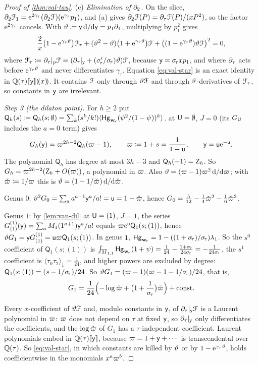 \begin{proof}[Proof of \cref{thm:val-tau}]
(c) \emph{Elimination of $\partial_2$.} On the slice, $\partial_2\mathcal{F}_1=\mathrm{e}^{2\gamma_\tau}(\partial_2\mathcal{F})(\mathrm{e}^{\gamma_\tau}p_1)$, and (a) gives $\partial_2\mathcal{F}(P)=\partial_\tau\mathcal{F}(P)/(xP^2)$, so the factor $\mathrm{e}^{2\gamma_\tau}$ cancels. With $\vartheta\coloneqq\mathsf{y}\,\mathrm{d}/\mathrm{d}\mathsf{y}=p_1\partial_1$, multiplying by $p_1^2$ gives
\begin{equation}\label{eq:val-star}
\frac{2}{x}\bigl(1-\mathrm{e}^{\gamma_\tau\vartheta}\bigr)\mathcal{F}_\tau+(\vartheta^2-\vartheta)\bigl(1+\mathrm{e}^{\gamma_\tau\vartheta}\bigr)\mathcal{F}+\bigl((1-\mathrm{e}^{\gamma_\tau\vartheta})\vartheta\mathcal{F}\bigr)^2=0,
\end{equation}
where $\mathcal{F}_\tau\coloneqq\partial_\tau|_p\mathcal{F}=(\partial_\tau|_{\mathsf{y}}+(\sigma_{\!\tau}'/\sigma_{\!\tau})\vartheta)\mathcal{F}$, because $\mathsf{y}=\sigma_{\!\tau} xp_1$, and where $\partial_\tau$ acts before $\mathrm{e}^{\gamma_\tau\vartheta}$ and never differentiates $\gamma_\tau$. Equation \eqref{eq:val-star} is an exact identity in $\mathbb{Q}(\tau)[\![ \mathsf{y} ]\!](\!(x)\!)$. It contains $\mathcal{F}$ only through $\vartheta\mathcal{F}$ and through $\vartheta$-derivatives of $\mathcal{F}_\tau$, so constants in $\mathsf{y}$ are irrelevant.

\emph{Step 3 (the dilaton point).} For $h\geq 2$ put $\mathsf{Q}_h(s)\coloneqq\mathsf{Q}_h(s;\emptyset)=\sum_k(s^k/k!)\langle\mathsf{Hg}_{\mathbf{w}_{\!\tau}}(\psi^2/(1-\psi))^k\rangle$.  at $\mathsf{U}=\emptyset$, $J=0$ (its $G_{\mathsf{U}}$ includes the $a=0$ term) gives
\[
G_h(\mathsf{y})=\varpi^{2h-2}\mathsf{Q}_h(\varpi-1),\qquad\varpi\coloneqq1+s=\frac{1}{1-\mathsf{u}},\qquad\mathsf{y}=\mathsf{u}\mathrm{e}^{-\mathsf{u}}.
\]
The polynomial $\mathsf{Q}_h$ has degree at most $3h-3$ and $\mathsf{Q}_h(-1)=\mathrm{Z}_h$. So $G_h=\varpi^{2h-2}(\mathrm{Z}_h+O(\varpi))$, a polynomial in $\varpi$. Also $\vartheta=(\varpi-1)\varpi^2\,\mathrm{d}/\mathrm{d}\varpi$; with $\check{\varpi}\coloneqq1/\varpi$ this is $\vartheta=(1-1/\check{\varpi})\,\mathrm{d}/\mathrm{d}\check{\varpi}$.

Genus $0$: $\vartheta^2G_0=\sum_aa^{a-1}\mathsf{y}^a/a!=\mathsf{u}=1-\check{\varpi}$, hence $G_0=\tfrac{5}{12}-\tfrac14\check{\varpi}^2-\tfrac16\check{\varpi}^3$.

Genus $1$: by \cref{lem:van-dil} at $\mathsf{U}=(1)$, $J=1$, the series $G^{(1)}_{(1)}(\mathsf{y})=\sum_aM_1(1^{a+1})\mathsf{y}^a/a!$ equals $\varpi\mathrm{e}^{\mathsf{u}}\mathsf{Q}_1(s;(1))$, hence $\vartheta G_1=\mathsf{y} G^{(1)}_{(1)}=\mathsf{u}\varpi\mathsf{Q}_1(s;(1))$. In genus $1$, $\mathsf{Hg}_{\mathbf{w}_{\!\tau}}=1-((1+\sigma_{\!\tau})/\sigma_{\!\tau})\lambda_1$. So the $s^0$ coefficient of $\mathsf{Q}_1(s;(1))$ is $\int_{\overline{M}_{1,1}}\mathsf{Hg}_{\mathbf{w}_{\!\tau}}(1+\psi)=\tfrac{1}{24}-\tfrac{1+\sigma_{\!\tau}}{24\sigma_{\!\tau}}=-\tfrac{1}{24\sigma_{\!\tau}}$, the $s^1$ coefficient is $\langle\tau_0\tau_2\rangle_1=\tfrac{1}{24}$, and higher powers are excluded by degree: $\mathsf{Q}_1(s;(1))=(s-1/\sigma_{\!\tau})/24$. So $\vartheta G_1=(\varpi-1)(\varpi-1-1/\sigma_{\!\tau})/24$, that is,
\[
G_1=\frac{1}{24}\Bigl(-\log\check{\varpi}+\bigl(1+\frac{1}{\sigma_{\!\tau}}\bigr)\check{\varpi}\Bigr)+\text{const}.
\]

Every $x$-coefficient of $\vartheta\mathcal{F}$ and, modulo constants in $\mathsf{y}$, of $\partial_\tau|_{\mathsf{y}}\mathcal{F}$ is a Laurent polynomial in $\varpi$: $\varpi$ does not depend on $\tau$ at fixed $\mathsf{y}$, so $\partial_\tau|_{\mathsf{y}}$ only differentiates the coefficients, and the $\log\check{\varpi}$ of $G_1$ has a $\tau$-independent coefficient. Laurent polynomials embed in $\mathbb{Q}(\tau)[\![ \mathsf{y} ]\!]$, because $\varpi=1+\mathsf{y}+\cdots$ is transcendental over $\mathbb{Q}(\tau)$. So \eqref{eq:val-star}, in which constants are killed by $\vartheta$ or by $1-\mathrm{e}^{\gamma_\tau\vartheta}$, holds coefficientwise in the monomials $x^a\varpi^b$.


\end{proof}
